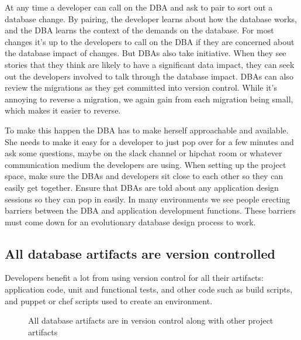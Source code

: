 \documentclass[12pt]{article}
\begin{document}
At any time a developer can call on the DBA and ask to pair to sort out
a database change. By pairing, the developer learns about how the
database works, and the DBA learns the context of the demands on the
database. For most changes it's up to the developers to call on the DBA
if they are concerned about the database impact of changes. But DBAs
also take initiative. When they see stories that they think are likely
to have a significant data impact, they can seek out the developers
involved to talk through the database impact. DBAs can also review the
migrations as they get committed into version control. While it's
annoying to reverse a migration, we again gain from each migration being
small, which makes it easier to reverse.

To make this happen the DBA has to make herself approachable and
available. She needs to make it easy for a developer to just pop over
for a few minutes and ask some questions, maybe on the slack channel or
hipchat room or whatever communication medium the developers are using.
When setting up the project space, make sure the DBAs and developers sit
close to each other so they can easily get together. Ensure that DBAs
are told about any application design sessions so they can pop in
easily. In many environments we see people erecting barriers between the
DBA and application development functions. These barriers must come down
for an evolutionary database design process to work.

\subsection{All database artifacts are version controlled}

Developers benefit a lot from using version control for all their
artifacts: application code, unit and functional tests, and other code
such as build scripts, and puppet or chef scripts used to create an
environment.

\begin{figure}[H]

  \caption{All database artifacts are in version control along with other project artifacts}
  \label{fig:db-artifact}
\end{figure}
\end{document}
